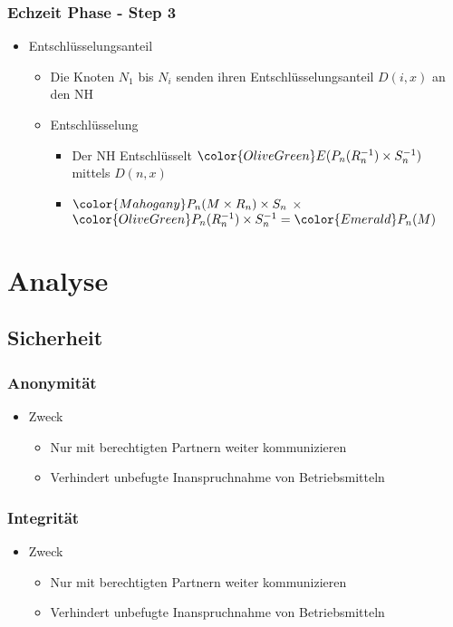 \documentclass[t, xcolor=dvipsnames]{beamer}
\begin{document}
\begin{frame}
	\frametitle{Echzeit Phase - Step 3}
	\begin{itemize}
		\item Entschlüsselungsanteil
			\begin{itemize}
				\item Die Knoten $N_1$ bis $N_{i}$ senden ihren Entschlüsselungsanteil $D(i,x)$ an den NH
				
		\item Entschlüsselung
		\begin{itemize}
				\item Der NH Entschlüsselt $\color{OliveGreen} E(P_n(R_n^{-1}) \times S_n^{-1})$ mittels $D(n,x)$
				\item $\color{Mahogany}P_n(M \times R_n) \times S_n$ $\times$ $\color{OliveGreen}P_n(R_n^{-1}) \times S_n^{-1} = \color{Emerald} P_n(M)$
			\end{itemize}
		\end{itemize}
	\end{itemize}
	\vspace{\fill}
\end{frame}


\section{Analyse}
\subsection{Sicherheit}
\begin{frame}
	\frametitle{Anonymität}
	\begin{itemize}
		\item Zweck
			\begin{itemize}
				\item Nur mit \alert{berechtigten Partnern} weiter kommunizieren
				\item Verhindert unbefugte Inanspruchnahme von Betriebsmitteln
			\end{itemize}
	\end{itemize}
	\vspace{\fill}
\end{frame}

\begin{frame}
	\frametitle{Integrität}
	\begin{itemize}
		\item Zweck
			\begin{itemize}
				\item Nur mit \alert{berechtigten Partnern} weiter kommunizieren
				\item Verhindert unbefugte Inanspruchnahme von Betriebsmitteln
			\end{itemize}
	\end{itemize}
	\vspace{\fill}
\end{frame}
\end{document}
